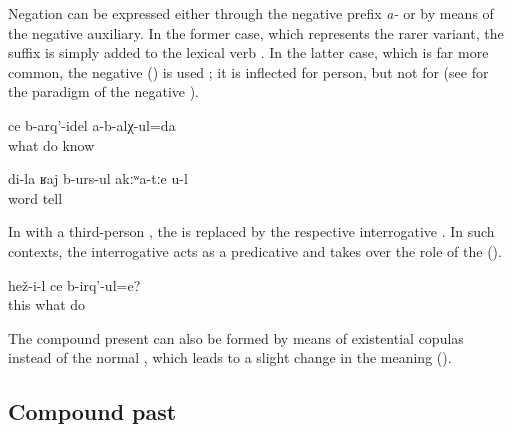 Negation can be expressed either through the negative prefix \textit{a-} or by means of the negative auxiliary. In the former case, which represents the rarer variant, the  suffix is simply added to the lexical verb . In the latter case, which is far more common, the negative    () is used ; it is inflected for person, but not for  (see  for the paradigm of the negative ).
%
\begin{exe}
	\ex	\label{ex:I do not know what to do analytic}
	\gll	ce	b-arq'-idel	a-b-alχ-ul=da\\
		what	do	know\\
	\glt	{}

	\ex	\label{ex:You tell only my words analytic}
	\gll	di-la	ʁaj	b-urs-ul	akːʷa-tːe	u-l\\
			word	tell		\\
	\glt	{}
\end{exe}

In  with a third-person , the  is replaced by the respective interrogative  . In such contexts, the interrogative  acts as a predicative  and takes over the role of the  ().
%
\begin{exe}
	\ex	\label{ex:What is he doing analytic}
	\gll	hež-i-l	ce	b-irq'-ul=e?\\
		this	what	do\\
	\glt	{}
\end{exe}

The compound present can also be formed by means of existential copulas instead of the normal , which leads to a slight change in the meaning ().



\subsection{Compound past}
\label{ssec:Compound past}

